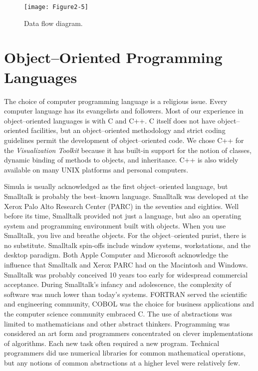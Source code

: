 \begin{figure}[!htb]
	\centering
	\texttt{[image: Figure2-5]}
	\caption{Data flow diagram.}
	\label{fig:Figure2-5}
\end{figure}

\section{Object--Oriented Programming Languages}

The choice of computer programming language is a religious issue. Every computer language has its evangelists and followers. Most of our experience in object--oriented languages is with C and C++. C itself does not have object--oriented facilities, but an object--oriented methodology and strict coding guidelines permit the development of object--oriented code. We chose C++ for the \emph{Visualization Toolkit} because it has built-in support for the notion of classes, dynamic binding of methods to objects, and inheritance. C++ is also widely available on many UNIX platforms and personal computers.

Simula \cite{Birtwistle79} is usually acknowledged as the first object--oriented language, but Smalltalk \cite{Goldberg83} is probably the best--known language. Smalltalk was developed at the Xerox Palo Alto Research Center (PARC) in the seventies and eighties. Well before its time, Smalltalk provided not just a language, but also an operating system and programming environment built with objects. When you use Smalltalk, you live and breathe objects. For the object--oriented purist, there is no substitute. Smalltalk spin-offs include window systems, workstations, and the desktop paradigm. Both Apple Computer and Microsoft acknowledge the influence that Smalltalk and Xerox PARC had on the Macintosh and Windows. Smalltalk was probably conceived 10 years too early for widespread commercial acceptance. During Smalltalk's infancy and adolescence, the complexity of software was much lower than today's systems. FORTRAN served the scientific and engineering community, COBOL was the choice for business applications and the computer science community embraced C. The use of abstractions was limited to mathematicians and other abstract thinkers. Programming was considered an art form and programmers concentrated on clever implementations of algorithms. Each new task often required a new program. Technical programmers did use numerical libraries for common mathematical operations, but any notions of common abstractions at a higher level were relatively few.


